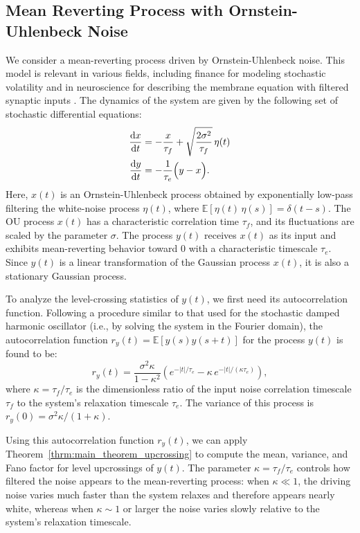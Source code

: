 \documentclass[journal]{IEEEtran}
\theoremstyle{plain}
\theoremstyle{definition}
\theoremstyle{remark}
\newcommand{\E}{\mathbb{E}}
\begin{document}
\subsection{Mean Reverting Process with Ornstein-Uhlenbeck Noise}
\label{sec:filtered_noise}
We consider a mean-reverting process driven by Ornstein-Uhlenbeck noise. This model is relevant in various fields, including finance for modeling stochastic volatility and in neuroscience for describing the membrane equation with filtered synaptic inputs \cite{moreno2002response}. The dynamics of the system are given by the following set of stochastic differential equations:
\begin{equation}
\begin{split}
    \frac{\mathrm{d}x}{\mathrm{d}t} &= -\frac{x}{\tau_f} + \sqrt{\frac{2 \sigma^2}{\tau_f}}\,\eta(t) \\
    \frac{\mathrm{d}y}{\mathrm{d}t} &= -\frac{1}{\tau_e}\Bigl(y - x\Bigr).
\end{split} \label{eq:OU_noise_eqns}
\end{equation}
Here, $x(t)$ is an Ornstein-Uhlenbeck process obtained by exponentially low-pass filtering the white-noise process \(\eta(t)\), where \(\E\left[\eta(t)\,\eta(s)\right]=\delta(t-s)\). The OU process $x(t)$ has a characteristic correlation time $\tau_f$, and its fluctuations are scaled by the parameter $\sigma$. The process $y(t)$ receives $x(t)$ as its input and exhibits mean-reverting behavior toward $0$ with a characteristic timescale $\tau_e$. Since $y(t)$ is a linear transformation of the Gaussian process $x(t)$, it is also a stationary Gaussian process. 


To analyze the level-crossing statistics of $y(t)$, we first need its autocorrelation function. Following a procedure similar to that used for the stochastic damped harmonic oscillator (i.e., by solving the system in the Fourier domain), the autocorrelation function $r_y(t) = \E[y(s)y(s+t)]$ for the process $y(t)$ is found to be:
\begin{equation}
    r_y(t) = \frac{\sigma^2\kappa}{1 -\kappa^2} \left(e^{-|t|/\tau_e} - \kappa \, e^{-|t|/(\kappa \tau_e)} \right), \label{eq:corr_func_OU_noise}
\end{equation}
where $\kappa=\tau_f/\tau_e$ is the dimensionless ratio of the input noise correlation timescale $\tau_f$ to the system's relaxation timescale $\tau_e$.  The variance of this process is $r_y(0) = \sigma^2\kappa/(1+\kappa)$.



Using this autocorrelation function $r_y(t)$, we can apply Theorem~\ref{thrm:main_theorem_upcrossing} to compute the mean, variance, and Fano factor for level upcrossings of $y(t)$. The parameter $\kappa = \tau_f / \tau_e$ controls how filtered the noise appears to the mean-reverting process: when $\kappa \ll 1$, the driving noise varies much faster than the system 
relaxes and therefore appears nearly white, whereas 
when $\kappa\sim1$ or larger the noise varies slowly 
relative to the system's relaxation timescale. 
\end{document}
